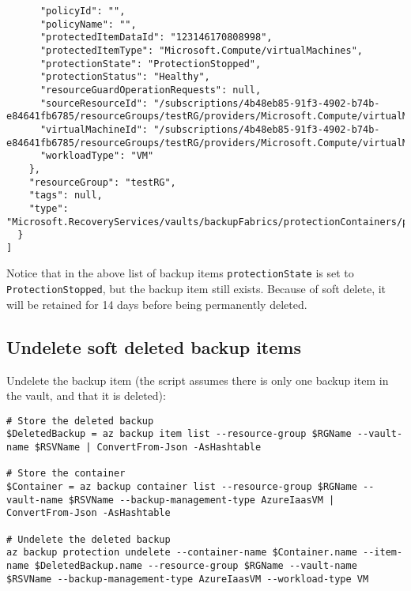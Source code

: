 \begin{verbatim}
      "policyId": "",
      "policyName": "",
      "protectedItemDataId": "123146170808998",
      "protectedItemType": "Microsoft.Compute/virtualMachines",
      "protectionState": "ProtectionStopped",
      "protectionStatus": "Healthy",
      "resourceGuardOperationRequests": null,
      "sourceResourceId": "/subscriptions/4b48eb85-91f3-4902-b74b-e84641fb6785/resourceGroups/testRG/providers/Microsoft.Compute/virtualMachines/clickhouseVM",
      "virtualMachineId": "/subscriptions/4b48eb85-91f3-4902-b74b-e84641fb6785/resourceGroups/testRG/providers/Microsoft.Compute/virtualMachines/clickhouseVM",
      "workloadType": "VM"
    },
    "resourceGroup": "testRG",
    "tags": null,
    "type": "Microsoft.RecoveryServices/vaults/backupFabrics/protectionContainers/protectedItems"
  }
]
\end{verbatim}

Notice that in the above list of backup items \texttt{protectionState} is set to \texttt{ProtectionStopped},
but the backup item still exists.
Because of soft delete, it will be retained for 14 days before being permanently deleted.
\subsection{Undelete soft deleted backup items}
\label{sec:org64ad495}
Undelete the backup item (the script assumes there is only one backup item in the vault, and that it is deleted):
\begin{verbatim}
# Store the deleted backup
$DeletedBackup = az backup item list --resource-group $RGName --vault-name $RSVName | ConvertFrom-Json -AsHashtable

# Store the container
$Container = az backup container list --resource-group $RGName --vault-name $RSVName --backup-management-type AzureIaasVM | ConvertFrom-Json -AsHashtable

# Undelete the deleted backup
az backup protection undelete --container-name $Container.name --item-name $DeletedBackup.name --resource-group $RGName --vault-name $RSVName --backup-management-type AzureIaasVM --workload-type VM
\end{verbatim}

